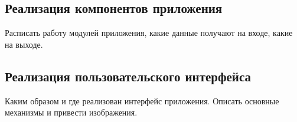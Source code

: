 \subsection{Реализация компонентов приложения}
\label{subsec:Components}
Расписать работу модулей приложения, какие данные получают на входе, какие на выходе.

\vspace{1.5em}
\subsection{Реализация пользовательского интерфейса}
\label{subsec:UserInt}
Каким образом и где реализован интерфейс приложения. Описать основные механизмы и привести изображения.
